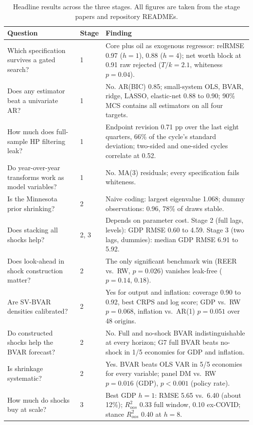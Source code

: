 \documentclass[conference]{IEEEtran}
\begin{document}
\begin{table}[t]
\caption{Headline results across the three stages. All figures are taken from the stage papers and repository READMEs.}
\label{tab:headline}
\centering
\small
\setlength{\tabcolsep}{5pt}
\begin{tabular}{@{}p{}p{}p{}@{}}
\toprule
Question & Stage & Finding \\
\midrule
Which specification survives a gated search? & 1 & Core plus oil as exogenous regressor: relRMSE 0.97 ($h{=}1$), 0.88 ($h{=}4$); net worth block at 0.91 raw rejected ($T/k=2.1$, whiteness $p=0.04$). \\
Does any estimator beat a univariate AR? & 1 & No. AR(BIC) 0.85; small-system OLS, BVAR, ridge, LASSO, elastic-net 0.88 to 0.90; 90\% MCS contains all estimators on all four targets. \\
How much does full-sample HP filtering leak? & 1 & Endpoint revision 0.71 pp over the last eight quarters, 66\% of the cycle's standard deviation; two-sided and one-sided cycles correlate at 0.52. \\
Do year-over-year transforms work as model variables? & 1 & No. MA(3) residuals; every specification fails whiteness. \\
Is the Minnesota prior shrinking? & 2 & Naive coding: largest eigenvalue 1.068; dummy observations: 0.96, 78\% of draws stable. \\
Does stacking all shocks help? & 2, 3 & Depends on parameter cost. Stage 2 (full lags, levels): GDP RMSE 0.60 to 4.59. Stage 3 (two lags, dummies): median GDP RMSE 6.91 to 5.92. \\
Does look-ahead in shock construction matter? & 2 & The only significant benchmark win (REER vs.\ RW, $p=0.026$) vanishes leak-free ($p=0.14$, $0.18$). \\
Are SV-BVAR densities calibrated? & 2 & Yes for output and inflation: coverage 0.90 to 0.92, best CRPS and log score; GDP vs.\ RW $p=0.068$, inflation vs.\ AR(1) $p=0.051$ over 48 origins. \\
Do constructed shocks help the BVAR forecast? & 2 & No. Full and no-shock BVAR indistinguishable at every horizon; G7 full BVAR beats no-shock in 1/5 economies for GDP and inflation. \\
Is shrinkage systematic? & 2 & Yes. BVAR beats OLS VAR in 5/5 economies for every variable; panel DM vs.\ RW $p=0.016$ (GDP), $p<0.001$ (policy rate). \\
How much do shocks buy at scale? & 3 & Best GDP $h{=}1$: RMSE 5.65 vs.\ 6.40 (about 12\%); $R^2_{oos}$ 0.33 full window, 0.10 ex-COVID; stance $R^2_{oos}$ 0.40 at $h{=}8$. \\

\end{tabular}
\end{table}
\end{document}
